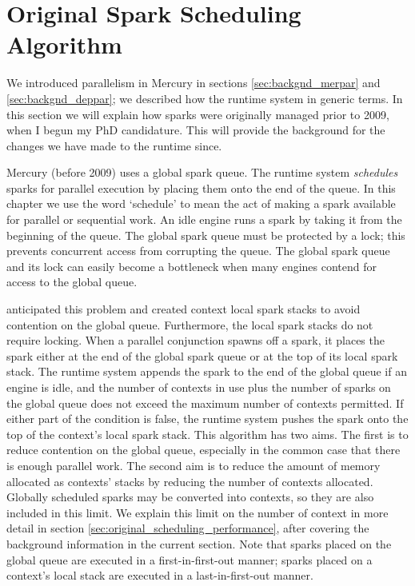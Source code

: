 
\section{Original Spark Scheduling Algorithm}
\label{sec:original_scheduling}

We introduced parallelism in Mercury in sections \ref{sec:backgnd_merpar} and
\ref{sec:backgnd_deppar};
we described how the runtime system in generic terms.
In this section we will explain how sparks were originally managed
prior to 2009,
when I begun my PhD candidature.
This will provide the background for the changes we have made to the
runtime since.

Mercury (before 2009) uses a global spark queue.
The runtime system \emph{schedules} sparks for parallel execution by placing
them onto the end of the queue.
In this chapter we use the word `schedule' to mean the act of making a spark
available for parallel or sequential work.
An idle engine runs a spark by taking it from the beginning of the queue.
The global spark queue must be protected by a lock;
this prevents concurrent access from corrupting the queue.
The global spark queue and its lock can easily become a bottleneck when many
engines contend for access to the global queue.

\citet{wang:2006:hons} anticipated this problem and created context local spark
stacks to avoid contention on the global queue.
Furthermore, the local spark stacks do not require locking.
When a parallel conjunction spawns off a spark,
it places the spark either at the end of the global spark queue or at the
top of its local spark stack.
The runtime system appends the spark to the end of the global queue if
an engine is idle, and
the number of contexts in use plus the number of sparks on the global queue
does not exceed the maximum number of contexts permitted.
If either part of the condition is false,
the runtime system pushes the spark onto the top of the context's local
spark stack.
This algorithm has two aims.
The first is to reduce contention on the global queue,
especially in the common case that there is enough parallel work.
The second aim is to reduce the amount of memory allocated
as contexts' stacks by reducing the number of contexts allocated.
Globally scheduled sparks may be converted into contexts,
so they are also included in this limit.
We explain this limit on the number of context in more detail
in section \ref{sec:original_scheduling_performance},
after covering the background information in the current section.
Note that sparks placed on the global queue are executed in a
first-in-first-out manner;
sparks placed on a context's local stack are executed in a
last-in-first-out manner.

